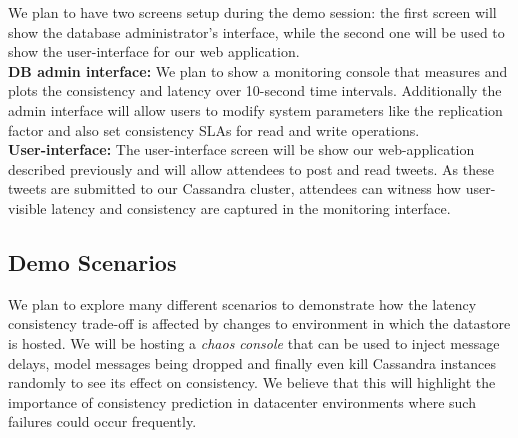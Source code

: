 We plan to have two screens setup during the demo session: the first screen will
show the database administrator's interface, while the second one will be used
to show the user-interface for our web application. \\

\textbf{DB admin interface:} We plan to show a monitoring console that
measures and plots the consistency and latency over 10-second time intervals.
Additionally the admin interface will allow users to modify system parameters
like the replication factor and also set consistency SLAs for read and write
operations.\\

\textbf{User-interface:} The user-interface screen will be show our
web-application described previously and will allow attendees to post and read
tweets. As these tweets are submitted to our Cassandra cluster, attendees can
witness how user-visible latency and consistency are captured in the monitoring
interface. 

\subsection{Demo Scenarios}
We plan to explore many different scenarios to demonstrate how the latency
consistency trade-off is affected by changes to environment in which the
datastore is hosted. We will be hosting a \textit{chaos console} that can be
used to inject message delays, model messages being dropped and finally even
kill Cassandra instances randomly to see its effect on consistency. We believe
that this will highlight the importance of consistency prediction in datacenter
environments where such failures could occur frequently.
